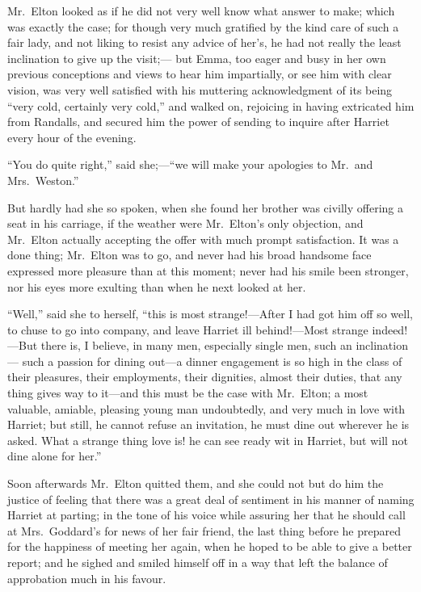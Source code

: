 Mr.\ Elton looked as if he did not very well know what answer to make;
which was exactly the case; for though very much gratified by the kind
care of such a fair lady, and not liking to resist any advice of
her's, he had not really the least inclination to give up the visit;---%
but Emma, too eager and busy in her own previous conceptions
and views to hear him impartially, or see him with clear vision,
was very well satisfied with his muttering acknowledgment of its
being ``very cold, certainly very cold,'' and walked on, rejoicing in
having extricated him from Randalls, and secured him the power
of sending to inquire after Harriet every hour of the evening.

``You do quite right,'' said she;---``we will make your apologies
to Mr.\ and Mrs.\ Weston.''

But hardly had she so spoken, when she found her brother was civilly
offering a seat in his carriage, if the weather were Mr.\ Elton's
only objection, and Mr.\ Elton actually accepting the offer with much
prompt satisfaction.  It was a done thing; Mr.\ Elton was to go,
and never had his broad handsome face expressed more pleasure than
at this moment; never had his smile been stronger, nor his eyes
more exulting than when he next looked at her.

``Well,'' said she to herself, ``this is most strange!---After I
had got him off so well, to chuse to go into company, and leave
Harriet ill behind!---Most strange indeed!---But there is, I believe,
in many men, especially single men, such an inclination---%
such a passion for dining out---a dinner engagement is so high in
the class of their pleasures, their employments, their dignities,
almost their duties, that any thing gives way to it---and this must
be the case with Mr.\ Elton; a most valuable, amiable, pleasing young
man undoubtedly, and very much in love with Harriet; but still,
he cannot refuse an invitation, he must dine out wherever he is asked.
What a strange thing love is! he can see ready wit in Harriet,
but will not dine alone for her.''

Soon afterwards Mr.\ Elton quitted them, and she could not but do him
the justice of feeling that there was a great deal of sentiment
in his manner of naming Harriet at parting; in the tone of his
voice while assuring her that he should call at Mrs.\ Goddard's
for news of her fair friend, the last thing before he prepared
for the happiness of meeting her again, when he hoped to be
able to give a better report; and he sighed and smiled himself
off in a way that left the balance of approbation much in his favour.

